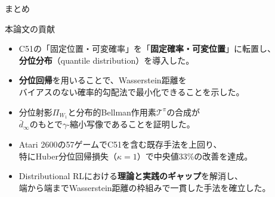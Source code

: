 \documentclass[aspectratio=169, dvipdfmx, 11pt]{beamer}
\newcommand{\green}[1]{\textcolor{green!40!black}{#1}}
\begin{document}
\begin{frame}{まとめ}
  \begin{block}{本論文の貢献}
    \begin{itemize}
      \item C51の「固定位置・可変確率」を「\textbf{固定確率・可変位置}」に\alert{転置}し、\\
        \textbf{分位分布}（quantile distribution）を導入した。
      \item \textbf{分位回帰}を用いることで、Wasserstein距離を\\
        \alert{バイアスのない確率的勾配法}で最小化できることを示した。
      \item 分位射影$\Pi_{W_1}$と分布的Bellman作用素$\mathcal{T}^\pi$の合成が\\
        $\bar{d}_\infty$のもとで\green{$\gamma$-縮小写像}であることを証明した。
      \item Atari 2600の57ゲームでC51を含む既存手法を上回り、\\
        特にHuber分位回帰損失（$\kappa = 1$）で中央値\alert{33\%の改善}を達成。
      \item Distributional RLにおける\textbf{理論と実践のギャップ}を解消し、\\
        端から端までWasserstein距離の枠組みで一貫した手法を確立した。
    \end{itemize}
  \end{block}
\end{frame}
\end{document}
